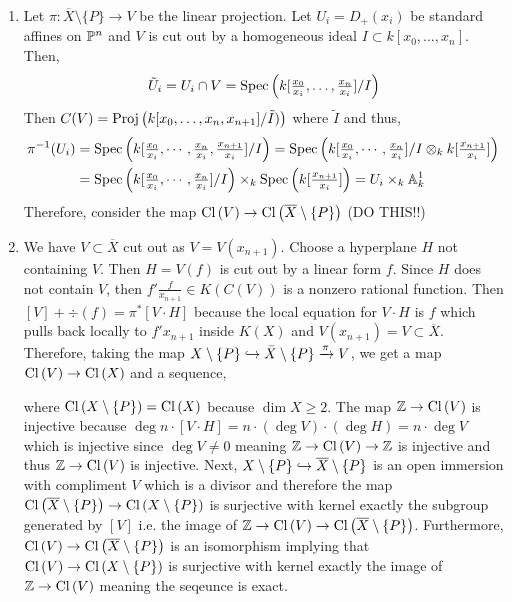 \documentclass[12pt]{article}
\begin{document}
\begin{enumerate}
\item Let $\pi : \overline{X} \setminus \{ P \} \to V$ be the linear projection. Let $U_i = D_{+}(x_i)$ be standard affines on $\P^n$ and $V$ is cut out by a homogeneous ideal $I \subset k[x_0, \dots, x_n]$. Then,
\[ \tilde{U}_i = U_i \cap V = \Spec{k[\tfrac{x_0}{x_i}, \dots, \tfrac{x_n}{x_i}]/I} \]
Then $C(V) = \Proj{k[x_0, \dots, x_n, x_{n+1}]/\tilde{I})}$ where $\tilde{I}$ and thus,
\begin{align*}
\pi^{-1}(U_i) & = \Spec{k[\tfrac{x_0}{x_i}, \cdots, \tfrac{x_n}{x_i}, \tfrac{x_{n+1}}{x_i}]/I} = \Spec{k[\tfrac{x_0}{x_i}, \cdots, \tfrac{x_n}{x_i}]/I \otimes_k k[\tfrac{x_{n+1}}{x_i}]} 
\\
& = \Spec{k[\tfrac{x_0}{x_i}, \cdots, \tfrac{x_n}{x_i}]/I} \times_k \Spec{k[\tfrac{x_{n+1}}{x_i}]} = U_i \times_k \A^1_k
\end{align*}
Therefore, consider the map $\Cl{V} \to \Cl{\overline{X} \setminus \{ P \}}$ (DO THIS!!)

\item We have $V \subset \overline{X}$ cut out as $V = V(x_{n+1})$. Choose a hyperplane $H$ not containing $V$. Then $H = V(f)$ is cut out by a linear form $f$. Since $H$ does not contain $V$, then $f' \frac{f}{x_{n+1}} \in K(C(V))$ is a nonzero rational function. Then $[V] + \div{(f)} = \pi^* [V \cdot H]$ because the local equation for $V \cdot H$ is $f$ which pulls back locally to $f' x_{n+1}$ inside $K(X)$ and $V(x_{n+1}) = V \subset \overline{X}$. Therefore, taking the map $X \setminus \{ P \} \embed \bar{X} \setminus \{ P \} \xrightarrow{\pi} V$, we get a map $\Cl{V} \to \Cl{X}$ and a sequence,
\begin{center}
\end{center}
where $\Cl{X \setminus \{ P \}} = \Cl{X}$ because $\dim{X} \ge 2$.
The map $\Z \to \Cl{V}$ is injective because $\deg{n \cdot [V \cdot H]} = n \cdot (\deg{V}) \cdot  (\deg{H}) = n \cdot \deg{V}$ which is injective since $\deg{V} \neq 0$ meaning $\Z \to \Cl{V} \to \Z$ is injective and thus $\Z \to \Cl{V}$ is injective. Next, $X \setminus \{ P \} \embed \overline{X} \setminus \{ P \}$ is an open immersion with compliment $V$ which is a divisor and therefore the map $\Cl{\overline{X} \setminus \{ P \}} \to \Cl{X \setminus \{ P \}}$ is surjective with kernel exactly the subgroup generated by $[V]$ i.e. the image of $\Z \to \Cl{V} \to \Cl{\overline{X} \setminus \{ P \}}$. Furthermore, $\Cl{V} \to \Cl{\overline{X} \setminus \{ P \}}$ is an isomorphism implying that $\Cl{V} \to \Cl{X \setminus \{ P \}}$ is surjective with kernel exactly the image of $\Z \to \Cl{V}$ meaning the seqeunce is exact.


\end{enumerate}
\end{document}
